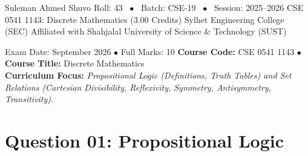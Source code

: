 \documentclass[11pt,a4paper]{article}
\begin{document}
\begin{titlepage}
\begin{flushleft}
\begin{minipage}{0.88\textwidth}
\begin{center}
  \end{center}
  
  \vspace{1.3cm}
  
  \makeMetadataCard
    {Suleman Ahmed Shuvo}
    {Roll: 43 \ $\bullet$ \ Batch: CSE-19 \ $\bullet$ \ Session: 2025--2026}
    {CSE 0541 1143: Discrete Mathematics (3.00 Credits)}
    {Sylhet Engineering College (SEC)}
    {Affiliated with Shahjalal University of Science \& Technology (SUST)}
\end{minipage}
\end{flushleft}
\end{titlepage}

\newpage
\begin{syllabusbox}{Exam Date: September 2026 $\bullet$ Full Marks: 10}
\textbf{Course Code:} CSE 0541 1143 $\bullet$ \textbf{Course Title:} Discrete Mathematics\\
\textbf{Curriculum Focus:} \textit{Propositional Logic (Definitions, Truth Tables) and Set Relations (Cartesian Divisibility, Reflexivity, Symmetry, Antisymmetry, Transitivity).}
\end{syllabusbox}

\vspace{2pt}

\section{Question 01: Propositional Logic}
\end{document}

